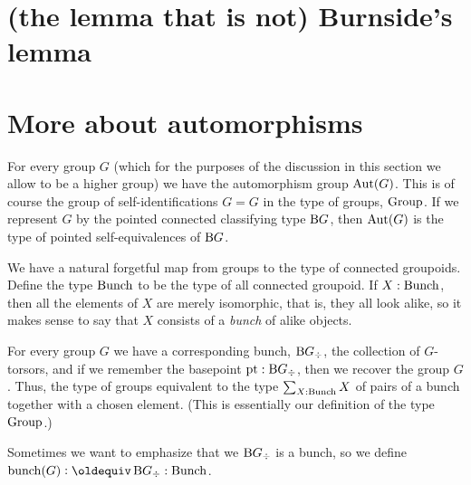 \section{(the lemma that is not) Burnside's lemma}
\label{sec:burnsides-lemma}

\section{More about automorphisms}
\label{sec:automorphisms}

For every group $G$ (which for the purposes of the discussion
in this section we allow to be a higher group)
we have the automorphism group $\operatorname{Aut}(G)$.
This is of course the group of self-identifications $G = G$ in the type of groups, $\mathord{\mathrm{Group}}$.
If we represent $G$ by the pointed connected classifying type $\operatorname{B}\! G$,
then $\operatorname{Aut}(G)$ is the type of pointed self-equivalences of $\operatorname{B}\! G$.

We have a natural forgetful map from groups to the type of connected groupoids.
Define the type $\mathord{\mathrm{Bunch}}$ to be the type of all connected groupoid.
If $X:\mathord{\mathrm{Bunch}}$, then all the elements of $X$ are merely isomorphic,
that is, they all look alike,
so it makes sense to say that $X$ consists of a \emph{bunch} of alike objects.

For every group $G$ we have a corresponding bunch, $\operatorname{B}\! G_\div$,
\ie{} the collection of $G$-torsors,
and if we remember the basepoint ${\mathord{\mathrm{pt}}} : \operatorname{B}\! G_\div$,
then we recover the group $G$.
Thus, the type of groups equivalent to the type
$\sum_{X : \mathord{\mathrm{Bunch}}} X$
of pairs of a bunch together with a chosen element.
(This is essentially our definition of the type $\mathord{\mathrm{Group}}$.)

Sometimes we want to emphasize that we $\operatorname{B}\! G_\div$ is a bunch,
so we define $\bunch(G) \defeq \B G_\div : \Bunch$.

